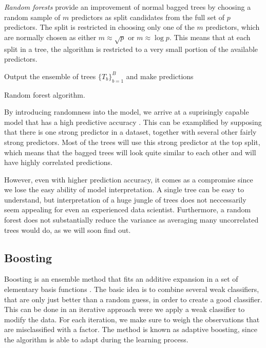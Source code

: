 \textit{Random forests} provide an improvement of normal bagged trees by choosing a random sample of $m$ predictors as split candidates from the full set of $p$ predictors. The split is restricted in choosing only one of the $m$ predictors, which are normally chosen as either $m \approx \sqrt{p} $ or $m \approx \log{p}$. This means that at each split in a tree, the algorithm is restricted to a very small portion of the available predictors. %

\begin{algorithm}[H]
\SetAlgoLined
 Output the ensemble of trees $\{T_b\}_{b=1}^B$ and make predictions
 \caption{Random forest algorithm.}
 \label{alg:randomforest}
\end{algorithm}

\noindent By introducing randomness into the model, we arrive at a suprisingly capable model that has a high predictive accuracy \cite{Caruana2006}. This can be examplified by supposing that there is one strong predictor in a dataset, together with several other fairly strong predictors. Most of the trees will use this strong predictor at the top split, which means that the bagged trees will look quite similar to each other and will have highly correlated predictions.

However, even with higher prediction accuracy, it comes as a compromise since we lose the easy ability of model interpretation. A single tree can be easy to understand, but interpretation of a huge jungle of trees does not neccessarily seem appealing for even an experienced data scientist. Furthermore, a random forest does not substantially reduce the variance as averaging many uncorrelated trees would do, as we will soon find out.

\subsection{Boosting}

Boosting is an ensemble method that fits an additive expansion in a set of elementary basis functions \cite{Murphy2012}. The basic idea is to combine several weak classifiers, that are only just better than a random guess, in order to create a good classifier. This can be done in an iterative approach were we apply a weak classifier to modify the data. For each iteration, we make sure to weigh the observations that are misclassified with a factor. The method is known as adaptive boosting, since the algorithm is able to adapt during the learning process.


